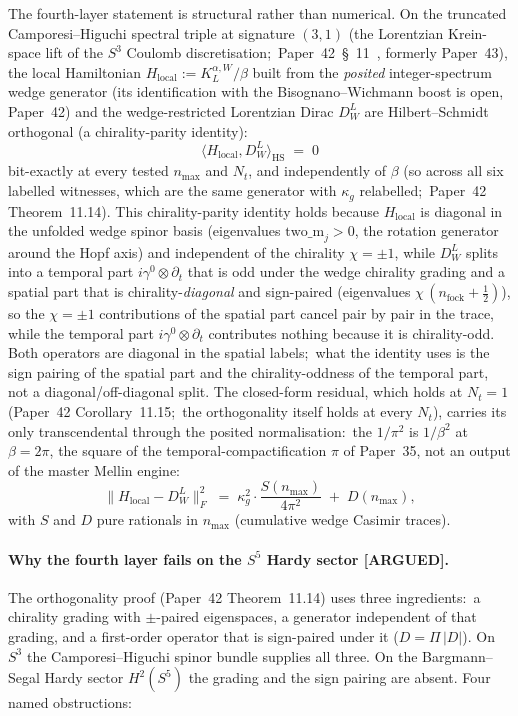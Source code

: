 \documentclass[twocolumn,pra,amsmath,amssymb,superscriptaddress]{revtex4-2}
\begin{document}
The fourth-layer statement is structural rather than numerical.
On the truncated Camporesi--Higuchi spectral triple at signature
$(3, 1)$ (the Lorentzian Krein-space lift of the $S^3$ Coulomb
discretisation;\ Paper~42~\S~11~\cite{paper42}, formerly Paper~43), the
local Hamiltonian $H_{\mathrm{local}} := K^{\alpha, W}_L / \beta$ built
from the \emph{posited} integer-spectrum wedge generator (its
identification with the Bisognano--Wichmann boost is open, Paper~42)
and the wedge-restricted Lorentzian Dirac
$D_W^L$ are Hilbert--Schmidt orthogonal (a chirality-parity
identity):
\[
   \langle H_{\mathrm{local}}, D_W^L \rangle_{\mathrm{HS}} \;=\; 0
\]
bit-exactly at every tested $n_{\max}$ and $N_t$, and independently
of $\beta$ (so across all six labelled witnesses, which are the same
generator with $\kappa_g$ relabelled;\ Paper~42 Theorem~11.14).  This
chirality-parity identity holds because
$H_{\mathrm{local}}$ is diagonal in the unfolded wedge spinor basis
(eigenvalues $\mathrm{two\_m}_j > 0$, the rotation generator around
the Hopf axis) and independent of the chirality $\chi = \pm 1$, while
$D_W^L$ splits into a temporal part $i\gamma^0 \otimes \partial_t$ that is
odd under the wedge chirality grading and a spatial part that is
chirality-\emph{diagonal} and sign-paired (eigenvalues
$\chi\,(n_{\mathrm{fock}} + \tfrac12)$), so the $\chi = \pm 1$
contributions of the spatial part cancel pair by pair in the trace,
while the temporal part $i\gamma^0 \otimes \partial_t$ contributes
nothing because it is chirality-odd.  Both operators are
diagonal in the spatial labels;\ what the identity uses is the sign
pairing of the spatial part and the chirality-oddness of the temporal
part, not a diagonal/off-diagonal split.  The closed-form residual,
which holds at $N_t = 1$ (Paper~42 Corollary~11.15;\ the orthogonality
itself holds at every $N_t$), carries
its only transcendental through the posited normalisation:\ the
$1/\pi^2$ is $1/\beta^2$ at $\beta = 2\pi$, the square of the
temporal-compactification $\pi$ of Paper~35, not an output of the
master Mellin engine:
\[
   \|H_{\mathrm{local}} - D_W^L\|_F^2
   \;=\; \kappa_g^2 \cdot \frac{S(n_{\max})}{4\pi^2}
       \;+\; D(n_{\max}),
\]
with $S$ and $D$ pure rationals in $n_{\max}$ (cumulative wedge
Casimir traces).

\paragraph{Why the fourth layer fails on the $S^5$ Hardy sector [ARGUED].}
The orthogonality proof (Paper~42 Theorem~11.14) uses three
ingredients:\ a chirality grading with $\pm$-paired eigenspaces, a
generator independent of that grading, and a first-order operator that
is sign-paired under it ($D = \Pi\,|D|$).  On $S^3$ the
Camporesi--Higuchi spinor bundle supplies all three.  On the
Bargmann--Segal Hardy sector $H^2(S^5)$ the grading and the sign pairing
are absent.  Four named obstructions:
\end{document}
